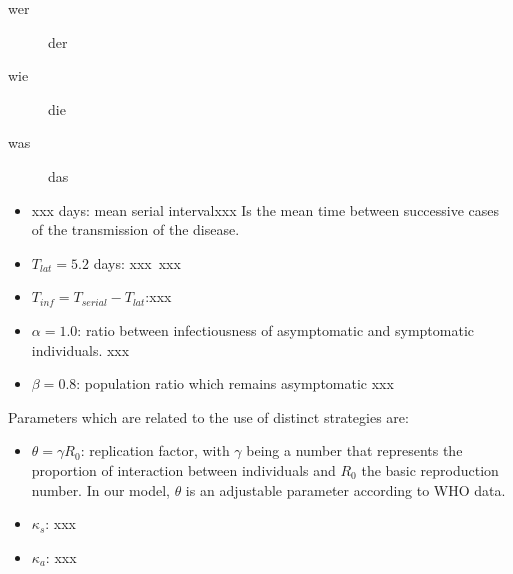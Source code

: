 \documentclass[11pt]{article}
\begin{document}
    \begin{description}
        \item[wer] der
        \item[wie] die
        \item[was] das
    \end{description}

    \begin{itemize}
	\item xxx days: mean serial intervalxxx
    Is the mean time between successive cases of the transmission of the disease.
	\item $T_{lat}=5.2$ days: xxx~xxx

	\item $T_{inf}=T_{serial}-T_{lat}$:xxx
	\item $\alpha=1.0$: ratio between infectiousness of asymptomatic and symptomatic
    individuals. xxx
	\item $\beta=0.8$: population ratio which remains asymptomatic xxx
\end{itemize}

Parameters which are related to the use of distinct strategies are:

\begin{itemize}
   \item $\theta=\gamma R_0$: replication factor, with $\gamma$ being
   a number that represents the proportion of interaction between individuals and
   $R_0$ the basic reproduction number. In our model, $\theta$ is an adjustable
   parameter according to WHO data.
    \item $\kappa _s$: xxx
	\item $\kappa _a$: xxx
\end{itemize}
\end{document}
